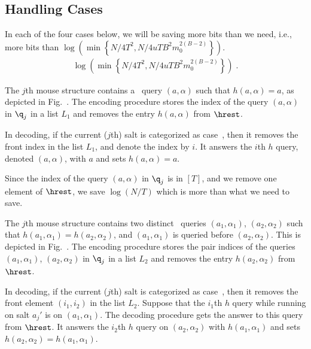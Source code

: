 \subsection{Handling Cases }
In each of the four cases below, we will be saving more bits than we need, i.e., more bits than 
\ifnum{}
$\log\left(\min\left\{{N}/{4T^2},{N}/{4uTB^2m_0^{2(B-2)}}\right\}\right)$.
\else
\begin{align*}
  \log\left(\min\left\{{N}/{4T^2},{N}/{4uTB^2m_0^{2(B-2)}}\right\}\right)\;.
\end{align*}
\fi

\label{sec:easy_cases}
\easymousefig
{} The $j$th mouse structure contains a \new\ query $(a,\alpha)$ such that $h(a,\alpha)=a$, as depicted in Fig.~. The encoding procedure stores the index of the query $(a,\alpha)$ in $\q_j$ in a list $L_1$ and removes the entry $h(a,\alpha)$ from $\hrest$.  

In decoding, if the current ($j$th) salt is categorized as case~, then it removes the front index in the list $L_1$, and denote the index by $i$. It answers the $i$th $h$ query, denoted $(a,\alpha)$, with $a$ and sets $h(a,\alpha)=a$. 

Since the index of the query $(a,\alpha)$ in $\q_j$ is in $[T]$, and we remove one element of $\hrest$, we save $\log (N/T)$ which is more than what we need to save.

 

The $j$th mouse structure contains two distinct \new\ queries $(a_1,\alpha_1)$, $(a_2,\alpha_2)$ such that $h(a_1,\alpha_1)=h(a_2,\alpha_2)$, and $(a_1,\alpha_1)$ is queried before $(a_2,\alpha_2)$. This is depicted in Fig.~. The encoding procedure stores the pair indices of the queries $(a_1,\alpha_1)$, $(a_2,\alpha_2)$ in $\q_j$ in a list $L_2$ and removes the entry $h(a_2,\alpha_2)$ from $\hrest$. 

In decoding, if the current ($j$th) salt is categorized as case~, then it removes the front element $(i_1,i_2)$ in the list $L_2$. Suppose that the $i_1$th $h$ query while running on salt $a_j'$ is on $(a_1,\alpha_1)$. The decoding procedure gets the answer to this query from $\hrest$. It answers the $i_2$th $h$ query on $(a_2,\alpha_2)$ with $h(a_1,\alpha_1)$ and sets $h(a_2,\alpha_2)=h(a_1,\alpha_1)$. 


